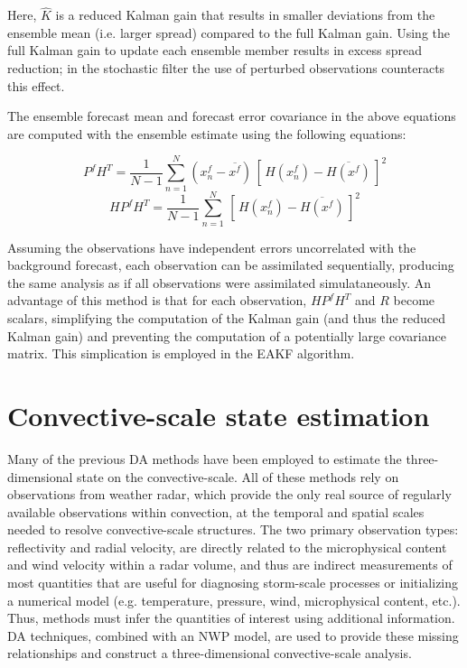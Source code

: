 Here, \( \hat{K} \) is a reduced Kalman gain that results in smaller deviations from the ensemble mean (i.e. larger spread) compared to the full Kalman gain. Using the full Kalman gain to update each ensemble member results in excess spread reduction; in the stochastic filter the use of perturbed observations counteracts this effect. 
	
The ensemble forecast mean and forecast error covariance in the above equations are computed with the ensemble estimate using the following equations:

\begin{equation}
   P^fH^T = \frac{1}{N-1}\sum_{n=1}^{N}(x_n^f - \overline{x^f})\,[\,H(x_n^f) - \overline{H(x^f)}\,]^2
\end{equation}
\begin{equation}
   HP^fH^T = \frac{1}{N-1}\sum_{n=1}^{N}\,[\,H(x_n^f) - \overline{H(x^f)}\,]^2
\end{equation}

Assuming the observations have independent errors uncorrelated with the background forecast, each observation can be assimilated sequentially, producing the same analysis as if all observations were assimilated simulataneously. An advantage of this method is that for each observation, \( HP^fH^T \) and \( R \) become scalars, simplifying the computation of the Kalman gain (and thus the reduced Kalman gain) and preventing the computation of a potentially large covariance matrix. This simplication is employed in the EAKF algorithm.

\pagebreak
\section{Convective-scale state estimation}
Many of the previous DA methods have been employed to estimate the three-dimensional state on the convective-scale. All of these methods rely on observations from weather radar, which provide the only real source of regularly available observations within convection, at the temporal and spatial scales needed to resolve convective-scale structures. The two primary observation types: reflectivity and radial velocity, are directly related to the microphysical content and wind velocity within a radar volume, and thus are indirect measurements of most quantities that are useful for diagnosing storm-scale processes or initializing a numerical model (e.g. temperature, pressure, wind, microphysical content, etc.). Thus, methods must infer the quantities of interest using additional information. DA techniques, combined with an NWP model, are used to provide these missing relationships and construct a three-dimensional convective-scale analysis.

